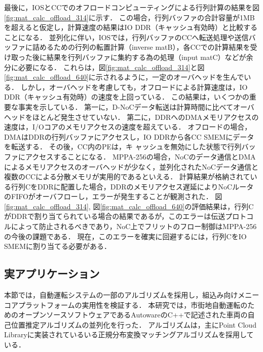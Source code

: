 \documentclass[submit,techrep]{ipsj_v2/UTF8/ipsj}
\begin{document}
最後に，IOSとCCでのオフロードコンピューティングによる行列計算の結果を図\ref{fig:mat_calc_offload_314}に示す．
この場合，行列バッファの合計容量が1MBを超えると仮定し，計算速度の結果はIO DDR（キャッシュ有効時）と比較することになる．
並列化に伴い，IOSでは，行列バッファのCCへ転送処理や送信バッファに詰めるための行列の転置計算（inverse matB），各CCでの計算結果を受け取った後に結果を行列バッファに集約する為の処理（input matC）などが余分に必要になる．
これらは，図\ref{fig:mat_calc_offload_314}と図\ref{fig:mat_calc_offload_640}に示されるように，一定のオーバヘッドを生んでいる．
しかし，オーバヘッドを考慮しても，オフロードによる計算速度は，IO DDR（キャッシュ有効時）の速度を上回っている．
この結果は，いくつかの重要な事実を示している．
第一に，D-NoCデータ転送は計算時間に比べてオーバヘッドをほとんど発生させていない．
第二に，DDRへのDMAメモリアクセスの速度は，I/Oコアのメモリアクセスの速度を超えている．
オフロードの場合，DMAはDDRの行列バッファにアクセスし，IO DDRから各CC SMEMにデータを転送する．
その後，CC内のPEは，キ ャッシュを無効にした状態で行列バッファにアクセスすることになる．
MPPA-256の場合，NoCのデータ通信とDMAによるメモリアクセスのオーバヘッドが少なく，並列化されたNoCデータ通信と複数のCCによる分散メモリが実用的であるといえる．
計算結果が格納されている行列CをDDRに配置した場合，DDRのメモリアクセス遅延によりNoCルータのFIFOがオーバフローし，エラーが発生することが観測された．
図\ref{fig:mat_calc_offload_314}, 図\ref{fig:mat_calc_offload_640}の評価結果は，行列CがDDRで割り当てられている場合の結果であるが，このエラーは伝送プロトコルによって防止されるべきであり，NoC上でフリットのフロー制御はMPPA-256の今後の課題である．
現在，このエラーを確実に回避するには，行列CをIO SMEMに割り当てる必要がある．

\subsection{実アプリケーション}
\label{sec:practical_application}
本節では，自動運転システムの一部のアルゴリズムを採用し，組込み向けメニーコアプラットフォームの実用性を検証する．
本研究では，市街地自動運転のためのオープンソースソフトウェアであるAutoware\cite{kato2015open}のC++で記述された車両の自己位置推定アルゴリズムの並列化を行った．
アルゴリズムは，主にPoint Cloud Library\cite{pcl}に実装されているいる正規分布変換マッチングアルゴリズム\cite{magnusson2009three}を採用している．
\end{document}
